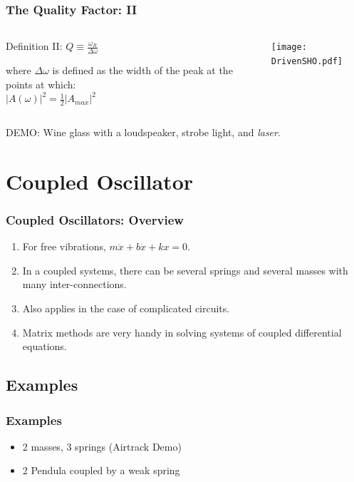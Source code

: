 \documentclass[pdf,hideothersubsections]{beamer}
\begin{document}
\begin{frame}
\frametitle{The Quality Factor: II}

\begin{columns}
\begin{column}{0.4\textwidth}
\pause
\begin{block}{Definition II:}
\centering
$Q \equiv \frac{\omega_R}{\Delta \omega}$
\end{block}
\pause
where $\Delta \omega$ is defined as the width of the peak at the
points at which: \\
\centering
$|A(\omega)|^2 = \frac{1}{2} |A_{max}|^2$

\end{column}

\pause
\begin{column}{0.6\textwidth}
\centering
\texttt{[image: DrivenSHO.pdf]}

\end{column}
\end{columns}
\pause
DEMO: Wine glass with a loudspeaker, strobe light, and \emph{laser}.
\end{frame}



\section{Coupled Oscillator}
\begin{frame}
\frametitle{Coupled Oscillators: Overview}
\pause
\begin{enumerate}
\item For free vibrations, $m \ddot{x} + b \dot{x} + k x = 0$.
\pause
\item In a coupled systems, there can be several springs and several
  masses with many inter-connections.
\pause
\item Also applies in the case of complicated circuits.
\pause
\item Matrix methods are very handy in solving systems of coupled
  differential equations.
\end{enumerate}
\end{frame}

\subsection{Examples}
\begin{frame}
\frametitle{Examples}

\begin{itemize}
\item 2 masses, 3 springs (Airtrack Demo)
\pause
\item 2 Pendula coupled by a weak spring

\end{itemize}


\end{frame}
\end{document}
